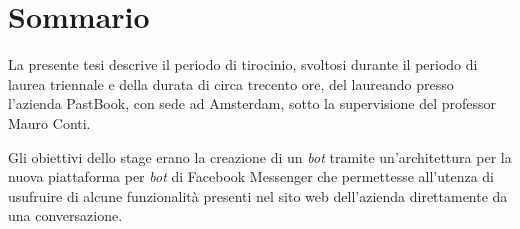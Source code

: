 \cleardoublepage
{}
\section*{Sommario}
\thispagestyle{empty}

La presente tesi descrive il periodo di tirocinio, svoltosi durante il periodo
di laurea triennale e della durata di circa trecento ore, del laureando
\myName{} presso l'azienda PastBook, con sede ad Amsterdam, sotto la
supervisione del professor Mauro Conti.

Gli obiettivi dello stage erano la creazione di un \textit{bot} tramite
un'architettura  per la nuova piattaforma per
\textit{bot} di Facebook Messenger che permettesse all'utenza di usufruire di
alcune funzionalità presenti nel sito web dell'azienda direttamente da una
conversazione.

\bigskip


